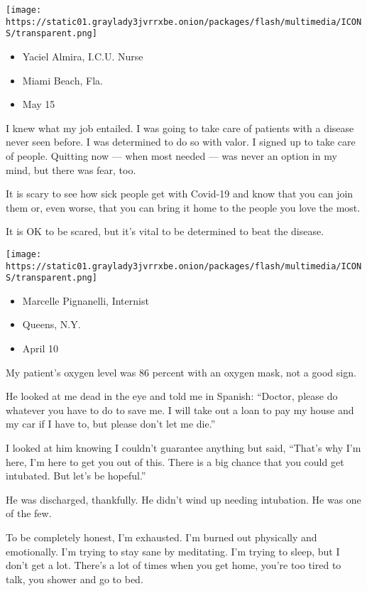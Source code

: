 \texttt{[image: https://static01.graylady3jvrrxbe.onion/packages/flash/multimedia/ICONS/transparent.png]}

\begin{itemize}
\tightlist
\item
  Yaciel Almira, I.C.U. Nurse
\item
  Miami Beach, Fla.
\item
  May 15
\end{itemize}

I knew what my job entailed. I was going to take care of patients with a
disease never seen before. I was determined to do so with valor. I
signed up to take care of people. Quitting now --- when most needed ---
was never an option in my mind, but there was fear, too.

It is scary to see how sick people get with Covid-19 and know that you
can join them or, even worse, that you can bring it home to the people
you love the most.

It is OK to be scared, but it's vital to be determined to beat the
disease.

\texttt{[image: https://static01.graylady3jvrrxbe.onion/packages/flash/multimedia/ICONS/transparent.png]}

\begin{itemize}
\tightlist
\item
  Marcelle Pignanelli, Internist
\item
  Queens, N.Y.
\item
  April 10
\end{itemize}

My patient's oxygen level was 86 percent with an oxygen mask, not a good
sign.

He looked at me dead in the eye and told me in Spanish: ``Doctor, please
do whatever you have to do to save me. I will take out a loan to pay my
house and my car if I have to, but please don't let me die.''

I looked at him knowing I couldn't guarantee anything but said, ``That's
why I'm here, I'm here to get you out of this. There is a big chance
that you could get intubated. But let's be hopeful.''

He was discharged, thankfully. He didn't wind up needing intubation. He
was one of the few.

To be completely honest, I'm exhausted. I'm burned out physically and
emotionally. I'm trying to stay sane by meditating. I'm trying to sleep,
but I don't get a lot. There's a lot of times when you get home, you're
too tired to talk, you shower and go to bed.

